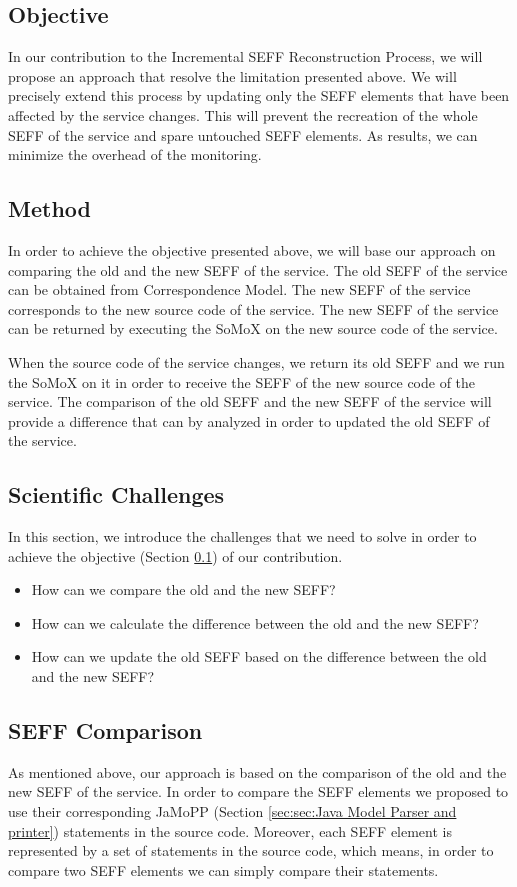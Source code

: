 \subsection{Objective}
\label{sec:objective}
In our contribution to the Incremental SEFF Reconstruction Process, we will propose an approach that resolve the limitation presented above. We will precisely extend this process by updating only the SEFF elements that have been affected by the service changes. This will prevent the recreation of the whole SEFF of the service and spare untouched SEFF elements. As results, we can minimize the overhead of the monitoring. 

\subsection{Method}
\label{sec:Method}
In order to achieve the objective presented above, we will base our approach on comparing the old and the new SEFF of the service. The old SEFF of the service can be obtained from Correspondence Model. The new SEFF of the service corresponds to the new source code of the service. The new SEFF of the service can be returned by executing the SoMoX on the new source code of the service. 

When the source code of the service changes, we return its old SEFF and we run the SoMoX on it in order to receive the SEFF of the new source code of the service. The comparison of the old SEFF and the new SEFF of the service will provide a difference that can by analyzed in order to updated the old SEFF of the service.  

\subsection{Scientific Challenges}
\label{sec:Scientific Challenges}
In this section, we introduce the challenges that we need to solve in order to achieve the objective (Section \ref{sec:objective}) of our contribution. 

\begin{itemize}
\item How can we compare the old and the new SEFF?
\item How can we calculate the difference between the old and the new SEFF?
\item How can we update the old SEFF based on the difference between the old and the new SEFF?
\end{itemize}


\subsection{SEFF Comparison}
\label{sec:SEFF Comparison}
As mentioned above, our approach is based on the comparison of the old and the new SEFF of the service. In order to compare the SEFF elements we proposed to use their corresponding JaMoPP (Section \ref{sec:sec:Java Model Parser and printer}) statements in the source code. Moreover, each SEFF element is represented by a set of statements in the source code, which means, in order to compare two SEFF elements we can simply compare their statements.\\

